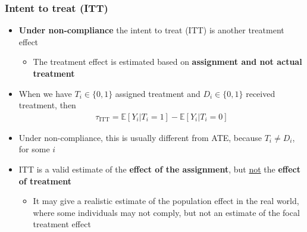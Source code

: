 \documentclass[10pt]{article}
\begin{document}
\subsubsection{Intent to treat (ITT)}
\begin{itemize}
    \item \textbf{Under non-compliance} the intent to treat (ITT) is another treatment effect 
    \begin{itemize}
        \item The treatment effect is estimated based on \textbf{assignment and not actual treatment }
    \end{itemize}
    \item When we have $T_i \in \{0, 1\}$ assigned treatment and $D_i \in \{0, 1\} $ received treatment, then 
    \begin{gather*}
        \tau_{\text{ITT}} = \mathbb{E}[Y_i | T_i = 1] - \mathbb{E}[Y_i | T_i = 0]
    \end{gather*}
    \item Under non-compliance, this is usually different from ATE, because $T_i \neq D_i $, for some $i $
    \item ITT is a valid estimate of the \textbf{effect of the assignment}, but \underline{not} the \textbf{effect of treatment}
    \begin{itemize}
        \item It may give a realistic estimate of the population effect in the real world, where some individuals may not comply, but not an estimate of the focal treatment effect 
    \end{itemize}
\end{itemize}
\newpage
\end{document}
